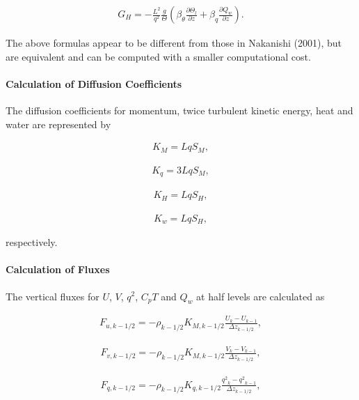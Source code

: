 \begin{eqnarray}G_H=-\frac{L^2}{q^2}\frac{g}{\Theta}\left(\beta_\theta \frac{\partial \Theta_l}{\partial z}+\beta_q \frac{\partial Q_w}{\partial z}\right).\end{eqnarray}

The above formulas appear to be different from those in Nakanishi
(2001), but are equivalent and can be computed with a smaller
computational cost.

\hypertarget{calculation-of-diffusion-coefficients-1}{%
\paragraph{Calculation of Diffusion
Coefficients}\label{calculation-of-diffusion-coefficients-1}}

The diffusion coefficients for momentum, twice turbulent kinetic energy,
heat and water are represented by

\begin{eqnarray}K_M=LqS_M,\end{eqnarray}

\begin{eqnarray}K_q=3LqS_M,\end{eqnarray}

\begin{eqnarray}K_H=LqS_H,\end{eqnarray}

\begin{eqnarray}K_w=LqS_H,\end{eqnarray}

respectively.

\hypertarget{calculation-of-fluxes}{%
\paragraph{Calculation of Fluxes}\label{calculation-of-fluxes}}

The vertical fluxes for \(U\), \(V\), \(q^2\), \(C_pT\) and \(Q_w\) at
half levels are calculated as

\begin{eqnarray}F_{u,k-1/2}=-\rho_{k-1/2}K_{M,k-1/2}\frac{U_{k}-U_{k-1}}{\Delta z_{k-1/2}},\end{eqnarray}

\begin{eqnarray}F_{v,k-1/2}=-\rho_{k-1/2}K_{M,k-1/2}\frac{V_{k}-V_{k-1}}{\Delta z_{k-1/2}},\end{eqnarray}

\begin{eqnarray}F_{q,k-1/2}=-\rho_{k-1/2}K_{q,k-1/2}\frac{{q^2}_ {k}-{q^2}_ {k-1}}{\Delta z_{k-1/2}},\end{eqnarray}

